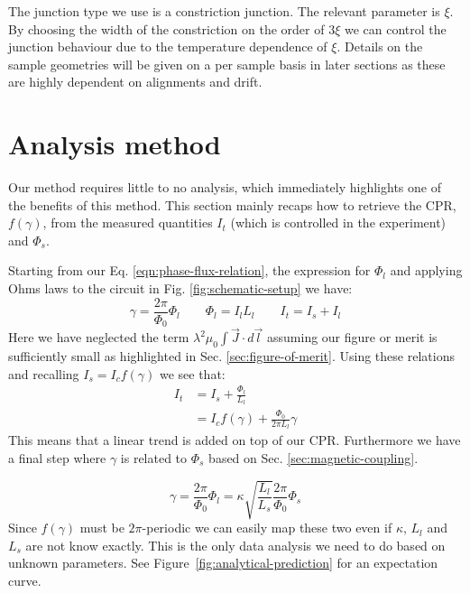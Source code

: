 The junction type we use is a constriction junction. The relevant parameter is $\xi$. By choosing the width of the constriction on the order of $3\xi$ we can control the junction behaviour due to the temperature dependence of $\xi$\cite{tinkhamIntroductionSuperconductivity}. Details on the sample geometries will be given on a per sample basis in later sections as these are highly dependent on alignments and drift.

\section{Analysis method}
Our method requires little to no analysis, which immediately highlights one of the benefits of this method. This section mainly recaps how to retrieve the CPR, $f(\gamma)$, from the measured quantities $I_t$ (which is controlled in the experiment) and $\Phi_s$.

Starting from our Eq. \ref{eqn:phase-flux-relation}, the expression for $\Phi_l$ and applying Ohms laws to the circuit in Fig. \ref{fig:schematic-setup} we have:
\begin{equation}
	\gamma = \frac{2\pi}{\Phi_0}\Phi_l \qquad \Phi_l = I_lL_l \qquad I_t = I_s + I_l
\end{equation}
Here we have neglected the term $\lambda^2\mu_0 \int \vec{J}\cdot d \vec{l}$ assuming our figure or merit is sufficiently small as highlighted in Sec. \ref{sec:figure-of-merit}. Using these relations and recalling $I_s = I_cf(\gamma)$ we see that:
\begin{align}
	I_t &= I_s + \frac{\Phi_l}{L_l} \nonumber \\
	    &= I_c f(\gamma) + \frac{\Phi_0}{2\pi L_l}\gamma
\end{align}
This means that a linear trend is added on top of our CPR. Furthermore we have a final step where $\gamma$ is related to $\Phi_s$ based on Sec. \ref{sec:magnetic-coupling}.

\begin{equation}
	\gamma = \frac{2\pi}{\Phi_0}\Phi_l = \kappa \sqrt{\frac{L_l}{L_s}} \frac{2\pi}{\Phi_0} \Phi_s
\end{equation}
Since $f(\gamma)$ must be $2\pi$-periodic we can easily map these two even if $\kappa$, $L_l$ and $L_s$ are not know exactly. This is the only data analysis we need to do based on unknown parameters. See Figure~\ref{fig:analytical-prediction} for an expectation curve.

